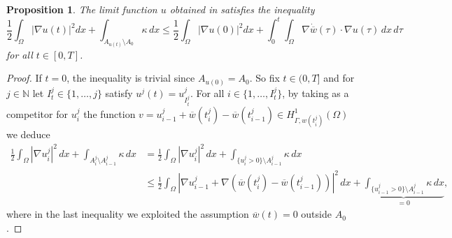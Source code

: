 \documentclass[a4paper,11pt,reqno]{amsart}
\numberwithin{equation}{section}
\newtheorem{prop}[teo]{Proposition}
\theoremstyle{definition}
\theoremstyle{remark}
\newcommand{\n}{\mathbb{N}}
\begin{document}
\begin{prop}
    The limit function $u$ obtained in  satisfies the inequality
    \begin{equation}
            \frac 12 \int_\Omega |\nabla u(t)|^2 dx+\int_{A_{u(t)}\setminus A_0}\kappa\,d x\le   \frac 12 \int_\Omega |\nabla u(0)|^2 dx+\int_0^t \int_\Omega \nabla \dot {\overline w}(\tau)\cdot \nabla u(\tau) \, dx\, d\tau
    \end{equation}
    for all $t\in [0,T]$.
\end{prop}
\begin{proof}
    If $t = 0$, the inequality is trivial since $A_{u(0)}=A_0$. So fix $t \in (0, T]$ and for $j\in \n$ let $I_t^j\in\{1,\dots, j\}$ satisfy $u^j(t)=u^j_{I_t^j}$. For all $i\in \{1,\dots, I^j_t\}$, by taking as a competitor for $u^j_i$ the function $v=u^j_{i-1}+\overline w(t^j_i)-\overline w(t^j_{i-1})\in H^1_{\Gamma,w(t^j_i)}(\Omega)$ we deduce
    \begin{align}
        \frac{1}{2}\int_\Omega |\nabla u^j_{i}|^2 \, dx + \int_{A^j_i\setminus A^j_{i-1}}\kappa\,dx&=\frac{1}{2}\int_\Omega |\nabla u^j_{i}|^2 \, dx + \int_{\{u^j_i>0\}\setminus A^j_{i-1}}\kappa\,dx \\
        &\leq \frac{1}{2}\int_\Omega |\nabla u^j_{i-1}+\nabla (\overline w(t^j_i)-\overline w(t^j_{i-1}))|^2 \, dx + \underbrace{\int_{\{u^j_{i-1}>0\}\setminus A^j_{i-1}}\kappa \,dx}_{=0},
    \end{align}
    where in the last inequality we exploited the assumption $\overline w(t)=0$ outside $A_0$.


\end{proof}
\end{document}
